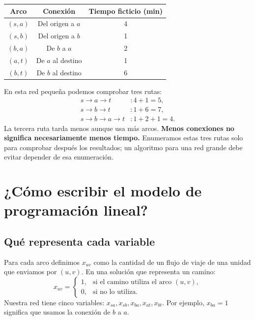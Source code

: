 \documentclass[11pt,letterpaper]{article}
\begin{document}
\begin{center}
\end{center}
\begin{center}
\begin{tabular}{ccc}
\toprule
Arco & Conexión & Tiempo ficticio (min)\\
\midrule
$(s,a)$ & Del origen a $a$ & 4\\
$(s,b)$ & Del origen a $b$ & 1\\
$(b,a)$ & De $b$ a $a$ & 2\\
$(a,t)$ & De $a$ al destino & 1\\
$(b,t)$ & De $b$ al destino & 6\\
\bottomrule
\end{tabular}
\end{center}
En esta red pequeña podemos comprobar tres rutas:
\[
\begin{aligned}
s\to a\to t &: 4+1=5,\\
s\to b\to t &: 1+6=7,\\
s\to b\to a\to t &: 1+2+1=4.
\end{aligned}
\]
La tercera ruta tarda menos aunque usa más arcos. \textbf{Menos conexiones no significa necesariamente menos tiempo.} Enumeramos estas tres rutas solo para comprobar después los resultados; un algoritmo para una red grande debe evitar depender de esa enumeración.

\section{¿Cómo escribir el modelo de programación lineal?}
\subsection{Qué representa cada variable}
Para cada arco definimos $x_{uv}$ como la cantidad de un flujo de viaje de una unidad que enviamos por $(u,v)$. En una solución que representa un camino:
\[
x_{uv}=\begin{cases}1,&\text{si el camino utiliza el arco }(u,v),\\0,&\text{si no lo utiliza.}\end{cases}
\]
Nuestra red tiene cinco variables: $x_{sa},x_{sb},x_{ba},x_{at},x_{bt}$. Por ejemplo, $x_{ba}=1$ significa que usamos la conexión de $b$ a $a$.
\end{document}
